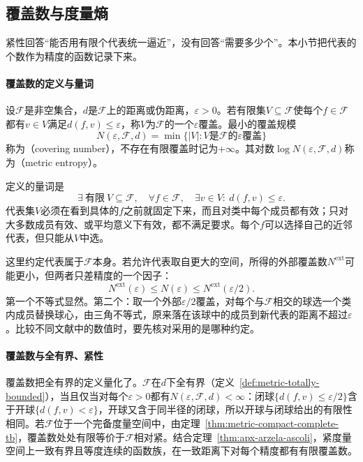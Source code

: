 \subsection{覆盖数与度量熵}
\label{sec:apx-covering}

紧性回答“能否用有限个代表统一逼近”，没有回答“需要多少个”。本小节把代表的个数作为精度的函数记录下来。

\paragraph{覆盖数的定义与量词}

\begin{definition}[覆盖数与度量熵]
\label{def:apx-covering-number}
设$\mathcal F$是非空集合，$d$是$\mathcal F$上的距离或伪距离，$\varepsilon>0$。若有限集$V\subseteq\mathcal F$使每个$f\in\mathcal F$都有$v\in V$满足$d(f,v)\le\varepsilon$，称$V$为$\mathcal F$的一个$\varepsilon$覆盖。最小的覆盖规模
\[
  N(\varepsilon,\mathcal F,d)=\min\bigl\{|V|:V\text{是}\mathcal F\text{的}\varepsilon\text{覆盖}\bigr\}
\]
称为（covering number），不存在有限覆盖时记为$+\infty$。其对数$\log N(\varepsilon,\mathcal F,d)$称为（metric entropy）。
\end{definition}

定义的量词是
\[
  \exists\ \text{有限}\ V\subseteq\mathcal F,\quad\forall f\in\mathcal F,\quad\exists v\in V:\ d(f,v)\le\varepsilon .
\]
代表集$V$必须在看到具体的$f$之前就固定下来，而且对类中每个成员都有效；只对大多数成员有效、或平均意义下有效，都不满足要求。每个$f$可以选择自己的近邻代表，但只能从$V$中选。

这里约定代表属于$\mathcal F$本身。若允许代表取自更大的空间，所得的外部覆盖数$N^{\mathrm{ext}}$可能更小，但两者只差精度的一个因子：
\[
  N^{\mathrm{ext}}(\varepsilon)\le N(\varepsilon)\le N^{\mathrm{ext}}(\varepsilon/2).
\]
第一个不等式显然。第二个：取一个外部$\varepsilon/2$覆盖，对每个与$\mathcal F$相交的球选一个类内成员替换球心，由三角不等式，原来落在该球中的成员到新代表的距离不超过$\varepsilon$。比较不同文献中的数值时，要先核对采用的是哪种约定。

\paragraph{覆盖数与全有界、紧性}

覆盖数把全有界的定义量化了。$\mathcal F$在$d$下全有界（定义~\ref{def:metric-totally-bounded}），当且仅当对每个$\varepsilon>0$都有$N(\varepsilon,\mathcal F,d)<\infty$：闭球$\{d(f,v)\le\varepsilon/2\}$含于开球$\{d(f,v)<\varepsilon\}$，开球又含于同半径的闭球，所以开球与闭球给出的有限性相同。若$\mathcal F$位于一个完备度量空间中，由定理~\ref{thm:metric-compact-complete-tb}，覆盖数处处有限等价于$\mathcal F$相对紧。结合定理~\ref{thm:apx-arzela-ascoli}，紧度量空间上一致有界且等度连续的函数族，在一致距离下对每个精度都有有限覆盖数。

